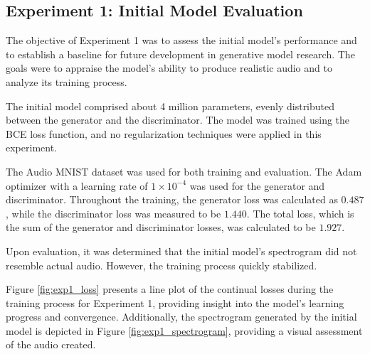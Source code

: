\subsection{Experiment 1: Initial Model Evaluation} \label{sec:exp1}

The objective of Experiment 1 was to assess the initial model's performance and to establish a baseline for future development in generative model research. The goals were to appraise the model's ability to produce realistic audio and to analyze its training process.

The initial model comprised about 4 million parameters, evenly distributed between the generator and the discriminator. The model was trained using the \ac{BCE} loss function, and no regularization techniques were applied in this experiment.

The Audio MNIST dataset was used for both training and evaluation. The Adam optimizer with a learning rate of $1 \times 10^{-4}$ was used for the generator and discriminator. Throughout the training, the generator loss was calculated as $0.487$, while the discriminator loss was measured to be $1.440$. The total loss, which is the sum of the generator and discriminator losses, was calculated to be $1.927$.

Upon evaluation, it was determined that the initial model's spectrogram did not resemble actual audio. However, the training process quickly stabilized.

Figure \ref{fig:exp1_loss} presents a line plot of the continual losses during the training process for Experiment 1, providing insight into the model's learning progress and convergence. Additionally, the spectrogram generated by the initial model is depicted in Figure \ref{fig:exp1_spectrogram}, providing a visual assessment of the audio created.

